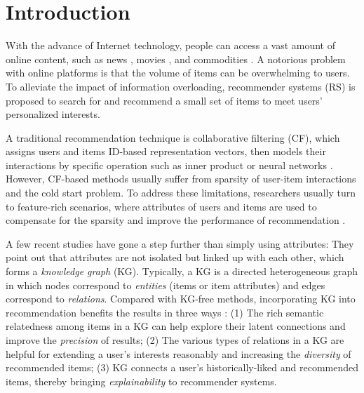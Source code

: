 \documentclass[sigconf]{acmart}
\begin{document}

\maketitle


\section{Introduction}
	With the advance of Internet technology, people can access a vast amount of online content, such as news \cite{zheng2018drn}, movies \cite{diao2014jointly}, and commodities \cite{zhou2018deep}.
	A notorious problem with online platforms is that the volume of items can be overwhelming to users.
	To alleviate the impact of information overloading, recommender systems (RS) is proposed to search for and recommend a small set of items to meet users' personalized interests. 

	A traditional recommendation technique is collaborative filtering (CF), which assigns users and items ID-based representation vectors, then models their interactions by specific operation such as inner product \cite{wang2017joint} or neural networks \cite{he2017neural}.
	However, CF-based methods usually suffer from sparsity of user-item interactions and the cold start problem.
	To address these limitations, researchers usually turn to feature-rich scenarios, where attributes of users and items are used to compensate for the sparsity and improve the performance of recommendation \cite{cheng2016wide,wang2018shine}.
	
	A few recent studies \cite{yu2014personalized,zhang2016collaborative,zhao2017meta,wang2018dkn,huang2018improving,wang2018ripple} have gone a step further than simply using attributes:
	They point out that attributes are not isolated but linked up with each other, which forms a \textit{knowledge graph} (KG).
	Typically, a KG is a directed heterogeneous graph in which nodes correspond to \textit{entities} (items or item attributes) and edges correspond to \textit{relations}.
	Compared with KG-free methods, incorporating KG into recommendation benefits the results in three ways \cite{wang2018ripple}:
	(1) The rich semantic relatedness among items in a KG can help explore their latent connections and improve the \textit{precision} of results;
	(2) The various types of relations in a KG are helpful for extending a user's interests reasonably and increasing the \textit{diversity} of recommended items;
	(3) KG connects a user's historically-liked and recommended items, thereby bringing \textit{explainability} to recommender systems.
	
\end{document}
